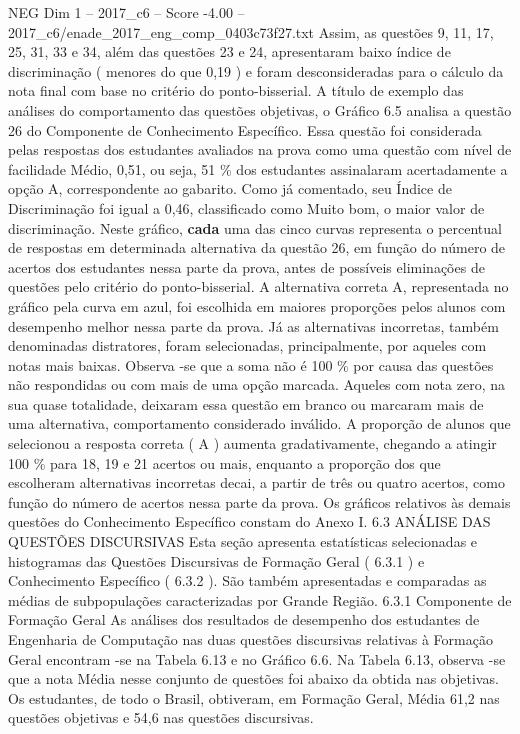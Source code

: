 \begin{textsample}{NEG Dim 1 – 2017\_c6 – Score -4.00 – 2017\_c6/enade\_2017\_eng\_comp\_0403c73f27.txt}
Assim, as questões 9, 11, 17, 25, 31, 33 e 34, além das questões 23 e 24, apresentaram baixo índice de discriminação ( menores do que 0,19 ) e foram desconsideradas para o cálculo da nota final com base no critério do ponto-bisserial.
A título de exemplo das análises do comportamento das questões objetivas, o Gráfico 6.5 analisa a questão 26 do Componente de Conhecimento Específico.
Essa questão foi considerada pelas respostas dos estudantes avaliados na prova como uma questão com nível de facilidade Médio, 0,51, ou seja, 51 \% dos estudantes assinalaram acertadamente a opção A, correspondente ao gabarito.
Como já comentado, seu Índice de Discriminação foi igual a 0,46, classificado como Muito bom, o maior valor de discriminação.
Neste gráfico, \textbf{cada} uma das cinco curvas representa o percentual de respostas em determinada alternativa da questão 26, em função do número de acertos dos estudantes nessa parte da prova, antes de possíveis eliminações de questões pelo critério do ponto-bisserial.
A alternativa correta A, representada no gráfico pela curva em azul, foi escolhida em maiores proporções pelos alunos com desempenho melhor nessa parte da prova.
Já as alternativas incorretas, também denominadas distratores, foram selecionadas, principalmente, por aqueles com notas mais baixas.
Observa -se que a soma não é 100 \% por causa das questões não respondidas ou com mais de uma opção marcada.
Aqueles com nota zero, na sua quase totalidade, deixaram essa questão em branco ou marcaram mais de uma alternativa, comportamento considerado inválido.
A proporção de alunos que selecionou a resposta correta ( A ) aumenta gradativamente, chegando a atingir 100 \% para 18, 19 e 21 acertos ou mais, enquanto a proporção dos que escolheram alternativas incorretas decai, a partir de três ou quatro acertos, como função do número de acertos nessa parte da prova.
Os gráficos relativos às demais questões do Conhecimento Específico constam do Anexo I. 6.3 ANÁLISE DAS QUESTÕES DISCURSIVAS Esta seção apresenta estatísticas selecionadas e histogramas das Questões Discursivas de Formação Geral ( 6.3.1 ) e Conhecimento Específico ( 6.3.2 ).
São também apresentadas e comparadas as médias de subpopulações caracterizadas por Grande Região. 6.3.1 Componente de Formação Geral As análises dos resultados de desempenho dos estudantes de Engenharia de Computação nas duas questões discursivas relativas à Formação Geral encontram -se na Tabela 6.13 e no Gráfico 6.6.
Na Tabela 6.13, observa -se que a nota Média nesse conjunto de questões foi abaixo da obtida nas objetivas.
Os estudantes, de todo o Brasil, obtiveram, em Formação Geral, Média 61,2 nas questões objetivas e 54,6 nas questões discursivas.

\end{textsample}
